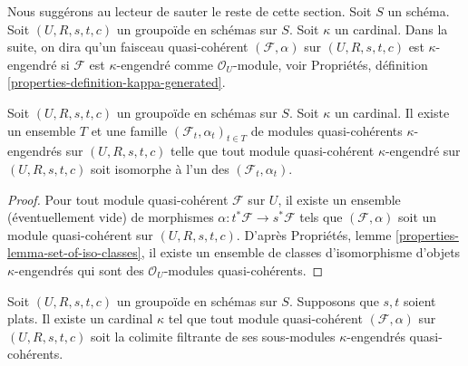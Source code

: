 \noindent
Nous suggérons au lecteur de sauter le reste de cette section. Soit $S$ un schéma.
Soit $(U, R, s, t, c)$ un groupoïde en schémas sur $S$. Soit $\kappa$ un
cardinal. Dans la suite, on dira qu'un faisceau quasi-cohérent
$(\mathcal{F}, \alpha)$ sur $(U, R, s, t, c)$ est $\kappa$-engendré si
$\mathcal{F}$ est $\kappa$-engendré comme $\mathcal{O}_U$-module, voir
Propriétés, définition \ref{properties-definition-kappa-generated}.

\begin{lemma}
\label{lemma-set-of-iso-classes}
Soit $(U, R, s, t, c)$ un groupoïde en schémas sur $S$.
Soit $\kappa$ un cardinal.
Il existe un ensemble $T$ et une famille $(\mathcal{F}_t, \alpha_t)_{t \in T}$ de
modules quasi-cohérents $\kappa$-engendrés sur $(U, R, s, t, c)$
telle que tout module quasi-cohérent $\kappa$-engendré sur
$(U, R, s, t, c)$ soit isomorphe à l'un des $(\mathcal{F}_t, \alpha_t)$.
\end{lemma}

\begin{proof}
Pour tout module quasi-cohérent $\mathcal{F}$ sur $U$, il existe un
ensemble (éventuellement vide) de morphismes $\alpha : t^*\mathcal{F} \to s^*\mathcal{F}$
tels que $(\mathcal{F}, \alpha)$ soit un module quasi-cohérent sur
$(U, R, s, t, c)$. D'après
Propriétés, lemme \ref{properties-lemma-set-of-iso-classes},
il existe un ensemble de classes d'isomorphisme d'objets $\kappa$-engendrés qui sont des
$\mathcal{O}_U$-modules quasi-cohérents.
\end{proof}

\begin{lemma}
\label{lemma-colimit-kappa}
Soit $(U, R, s, t, c)$ un groupoïde en schémas sur $S$.
Supposons que $s, t$ soient plats. Il existe un
cardinal $\kappa$ tel que tout module quasi-cohérent
$(\mathcal{F}, \alpha)$ sur $(U, R, s, t, c)$
soit la colimite filtrante de ses sous-modules $\kappa$-engendrés
quasi-cohérents.
\end{lemma}

